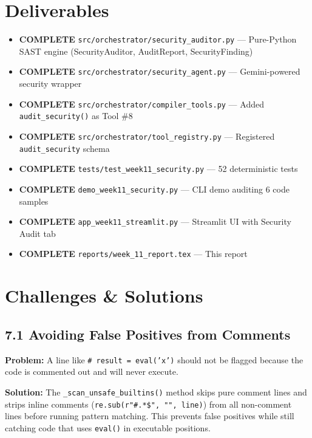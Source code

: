 \documentclass[a4paper,11pt]{article}
\newcommand{\statusgood}[1]{\colorbox{green!20}{\textbf{#1}}}
\begin{document}
\section{Deliverables}

\begin{itemize}[leftmargin=*]
    \item \statusgood{COMPLETE} \texttt{src/orchestrator/security\_auditor.py} --- Pure-Python SAST engine (SecurityAuditor, AuditReport, SecurityFinding)
    \item \statusgood{COMPLETE} \texttt{src/orchestrator/security\_agent.py} --- Gemini-powered security wrapper
    \item \statusgood{COMPLETE} \texttt{src/orchestrator/compiler\_tools.py} --- Added \texttt{audit\_security()} as Tool \#8
    \item \statusgood{COMPLETE} \texttt{src/orchestrator/tool\_registry.py} --- Registered \texttt{audit\_security} schema
    \item \statusgood{COMPLETE} \texttt{tests/test\_week11\_security.py} --- 52 deterministic tests
    \item \statusgood{COMPLETE} \texttt{demo\_week11\_security.py} --- CLI demo auditing 6 code samples
    \item \statusgood{COMPLETE} \texttt{app\_week11\_streamlit.py} --- Streamlit UI with Security Audit tab
    \item \statusgood{COMPLETE} \texttt{reports/week\_11\_report.tex} --- This report
\end{itemize}

\section{Challenges \& Solutions}

\subsection{7.1 Avoiding False Positives from Comments}

\textbf{Problem:} A line like \texttt{\# result = eval('x')} should not be flagged because the code is commented out and will never execute.

\textbf{Solution:} The \texttt{\_scan\_unsafe\_builtins()} method skips pure comment lines and strips inline comments (\texttt{re.sub(r"\#.*\$", "", line)}) from all non-comment lines before running pattern matching. This prevents false positives while still catching code that uses \texttt{eval()} in executable positions.
\end{document}
